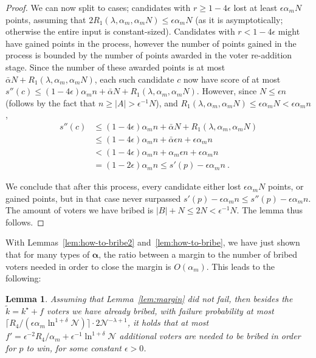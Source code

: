 \documentclass[letterpaper]{article} %
\newtheorem{lemma}[theorem]{Lemma}
\theoremstyle{definition}
\newcommand{\abs}[1]{\lvert #1 \rvert}
\newcommand{\NN}{\mathcal{N}}
\newcommand\vecgreek{\bm}
\newcommand{\veca}{\vecgreek{\alpha}}
\begin{document}
\begin{proof}
	We can now split to cases; candidates with $r\geq 1-4\epsilon$ lost at least $\epsilon \alpha_m N$ points, assuming that  $2R_1(\lambda, \alpha_{m}, \alpha_m N) \leq\epsilon \alpha_m N$ (as it is asymptotically; otherwise the entire input is constant-sized).
	Candidates with $r<  1-4\epsilon$ might have gained points in the process, however the number of points gained in the process is bounded by the number of points awarded in the voter re-addition stage. Since the number of these awarded points is at most  $\bar{\alpha}N + R_1(\lambda, \alpha_{m}, \alpha_m N)$, each such candidate $c$ now have score of at most $s''(c) \leq (1-4\epsilon)\alpha_mn + \bar{\alpha} N + R_1(\lambda, \alpha_{m}, \alpha_m N)$. However,  since $N \leq \epsilon n$ (follows by the fact that $n \geq \abs{A}> \epsilon^{-1}N$), and $R_1(\lambda, \alpha_{m}, \alpha_m N) \leq\epsilon \alpha_m N < \epsilon \alpha_m n$,
	\begin{align*}
	s''(c) &\leq (1-4\epsilon)\alpha_m n + \bar{\alpha} N+ R_1(\lambda, \alpha_{m}, \alpha_m N)\\
	&\leq (1-4\epsilon)\alpha_m n + \bar{\alpha} \epsilon n+ \epsilon \alpha_m n\\
	&< (1-4\epsilon)\alpha_m n + \alpha_m \epsilon n + \epsilon \alpha_m n\\
	&= (1-2\epsilon)\alpha_m n  \leq s'(p) - \epsilon\alpha_m n \ .
	\end{align*}

	We conclude that after this process, every candidate either lost $\epsilon \alpha_m N$ points, or gained points, but in that case never surpassed $s'(p) - \epsilon\alpha_m n \leq s''(p) - \epsilon\alpha_m n$. The amount of voters we have bribed is $\abs{B} + N \leq 2N < \epsilon^{-1}N$. The lemma thus follows.
\end{proof}
With Lemmas~\ref{lem:how-to-bribe2} and~\ref{lem:how-to-bribe}, we have just shown that for many types of $\veca$, the ratio between a margin to the number of bribed voters needed in order to close the margin is $O(\alpha_m)$.
This leads to the following:
\begin{lemma}\label{lem:f'}
	Assuming that Lemma~\ref{lem:margin} did not fail, then besides the $\tilde{k}= k^\star +f$ voters we have already bribed, with failure probability at most $\lceil R_4/(\epsilon \alpha_m \ln^{1+\delta}\NN)\rceil \cdot 2\NN^{-\lambda+1}$, it  holds that
	at most $f'=\epsilon^{-2} R_4 / \alpha_m + \epsilon^{-1}\ln^{1+\delta}\NN $ additional voters are needed to be bribed in order for $p$ to win, for some constant $\epsilon > 0$.
\end{lemma}
\end{document}
